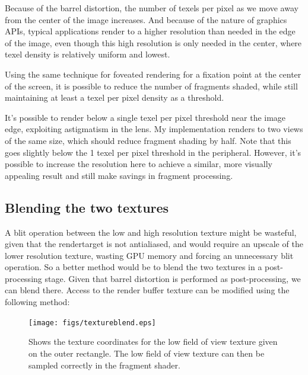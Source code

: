 \documentclass[12pt,a4paper,twoside,openright]{report}
\begin{document}
Because of the barrel distortion, the number of texels per pixel as we move away from the center of the image increases. And because of the nature of graphics APIs, typical applications render to a higher resolution than needed in the edge of the image, even though this high resolution is only needed in the center, where texel density is relatively uniform and lowest.

Using the same technique for foveated rendering for a fixation point at the center of the screen, it is possible to reduce the number of fragments shaded, while still maintaining at least a texel per pixel density as a threshold.

It's possible to render below a single texel per pixel threshold near the image edge, exploiting astigmatism in the lens. My implementation renders to two views of the same size, which should reduce fragment shading by half. Note that this goes slightly below the 1 texel per pixel threshold in the peripheral. However, it's possible to increase the resolution here to achieve a similar, more visually appealing result and still make savings in fragment processing.

\subsection{Blending the two textures}\label{blending}

A blit operation between the low and high resolution texture might be wasteful, given that the rendertarget is not antialiased, and would require an upscale of the lower resolution texture, wasting GPU memory and forcing an unnecessary blit operation. So a better method would be to blend the two textures in a post-processing stage. Given that barrel distortion is performed as post-processing, we can blend there. Access to the render buffer texture can be modified using the following method:

\begin{figure}[tbh]
\centerline{\texttt{[image: figs/textureblend.eps]}}
\caption{Shows the texture coordinates for the low field of view texture given on the outer rectangle. The low field of view texture can then be sampled correctly in the fragment shader.}
\label{fig:texblend}
\end{figure}
\end{document}
